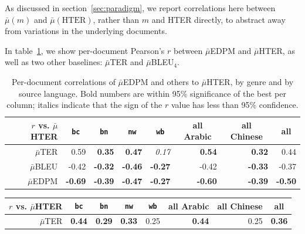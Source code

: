 \documentclass{kluwer}    %
\begin{document}
\begin{article}
As discussed in section~\ref{sec:paradigm}, we report correlations
here between $\bar{\mu}(m)$ and $\bar{\mu}(\textrm{HTER})$, rather than
$m$ and HTER directly, to abstract away from variations in the
underlying documents. 

In table~\ref{tab:hterperdoc}, we show per-document Pearson's $r$
between $\bar{\mu}$EDPM and $\bar{\mu}$HTER, as well as two other
baselines: $\bar{\mu}$TER and $\bar{\mu}$BLEU$_4$.  
\begin{subtable}
  \begin{table}
    \begin{tabular}{r|rrrr|rr|r}
      \hline
      $r$ vs. $\bar{\mu}$HTER & \multicolumn{1}{c}{\texttt{bc}}
      & \multicolumn{1}{c}{\texttt{bn}} &
      \multicolumn{1}{c}{\texttt{nw}} & \multicolumn{1}{c}{\texttt{wb}}
      & \multicolumn{1}{|c}{all Arabic} & \multicolumn{1}{c|}{all Chinese}
      & \multicolumn{1}{c}{all} \\
      \hline
      $\bar{\mu}$TER
      &  0.59 &  \textbf{0.35} &  \textbf{0.47}&  \textit{0.17}
      & \textbf{0.54} & \textbf{0.32} &  0.44\\
      $\bar{\mu}$BLEU
      & -0.42 & \textbf{-0.32} & \textbf{-0.46}&  \textbf{-0.27}
      & -0.42  &  \textbf{-0.33} & -0.37 \\
      $\bar{\mu}$EDPM
      & \textbf{-0.69} & \textbf{-0.39} & \textbf{-0.47} &
      \textbf{-0.27}
      & \textbf{-0.60} & \textbf{-0.39} & \textbf{-0.50} \\
      \hline
    \end{tabular}
    \caption{Per-document correlations of $\bar{\mu}$EDPM and others to
      $\bar{\mu}$HTER, by genre and by source language. Bold numbers are
      within 95\% significance of the best per column; italics indicate
      that the sign of the $r$ value has less than 95\% confidence.}
    \label{tab:hterperdoc}
  \end{table}
  \begin{table}
    \begin{tabular}{r|rrrr|rr|r}
      \hline
      $r$ vs. $\bar{\mu}$HTER & \multicolumn{1}{c}{\texttt{bc}}
      & \multicolumn{1}{c}{\texttt{bn}} &
      \multicolumn{1}{c}{\texttt{nw}} & \multicolumn{1}{c}{\texttt{wb}}
      & \multicolumn{1}{|c}{all Arabic} & \multicolumn{1}{c|}{all Chinese}
      & \multicolumn{1}{c}{all} \\
      \hline
      $\bar{\mu}$TER
      &  \textbf{0.44} &  \textbf{0.29} &  \textbf{0.33}&  0.25
      & \textbf{0.44} & 0.25  &  \textbf{0.36}\\

\end{tabular}
\end{table}
\end{subtable}
\end{article}
\end{document}
